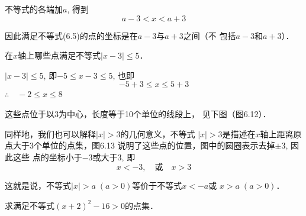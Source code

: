 不等式的各端加$a$, 得到
\begin{equation}
    a-3<x<a+3    
\end{equation}

因此满足不等式(6.5)的点的坐标是在$a-3$与$a+3$之间（不
包括$a-3$和$a+3$）．

\begin{example}
    在$x$轴上哪些点满足不等式$|x-3|\le 5$．
\end{example}

\begin{solution}
    $|x-3|\le 5$, 即$-5\le x-3\le 5$, 也即
$$-5+3\le x\le 5+3$$
$\therefore\quad -2\le x\le 8$

这些点位于以3为中心，长度等于10个单位的线段上，
见下图（图6.12）．
\begin{figure}[htp]
    \centering
{}

    \caption{}
\end{figure}
\end{solution}

同样地，我们也可以解释$|x|>3$的几何意义，不等式
$|x|>3$是描述在$x$轴上距离原点大于3个单位的点集，图6.13
说明了这些点的位置，图中的圆圈表示去掉$\pm 3$, 因此这些
点的坐标小于$-3$或大于3, 即
\[x<-3,\quad \text{或}\quad x>3\]

\begin{figure}[htp]
    \centering
{}

    \caption{}
\end{figure}

这就是说，不等式$|x|>a\; (a>0)$等价于不等式$x<-a$或
$x>a\; (a>0)$．


\begin{example}
    求满足不等式$(x+2)^2-16>0$的点集．
\end{example}

